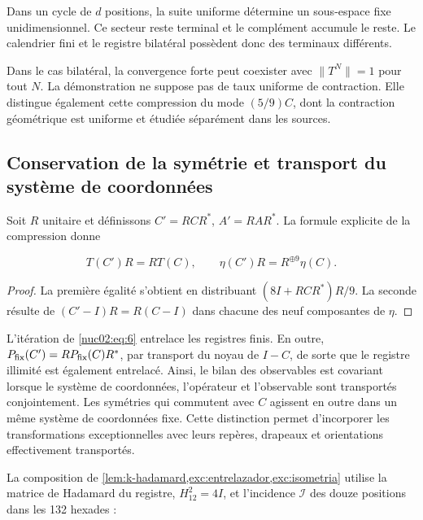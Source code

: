 \begin{corollary}
Dans un cycle de \(d\) positions, la suite uniforme détermine un sous-espace fixe unidimensionnel. Ce secteur reste terminal et le complément accumule le reste. Le calendrier fini et le registre bilatéral possèdent donc des terminaux différents.

\end{corollary}

Dans le cas bilatéral, la convergence forte peut coexister avec \(\|T^N\|=1\) pour tout \(N\). La démonstration ne suppose pas de taux uniforme de contraction. Elle distingue également cette compression du mode \((5/9)C\), dont la contraction géométrique est uniforme et étudiée séparément dans les sources.

\subsection{Conservation de la symétrie et transport du système de coordonnées}

Soit \(R\) unitaire et définissons \(C'=RCR^*\), \(A'=RAR^*\). La formule explicite de la compression donne

\begin{equation}
T(C')R=RT(C),\qquad
\eta(C')R=R^{\oplus9}\eta(C).\label{nuc02:eq:6}
\end{equation}

\begin{proof}
La première égalité s’obtient en distribuant \((8I+RCR^*)R/9\). La seconde résulte de \((C'-I)R=R(C-I)\) dans chacune des neuf composantes de \(\eta\).

\end{proof}

L’itération de \eqref{nuc02:eq:6} entrelace les registres finis. En outre, \(P_{\rm fix}(C')=RP_{\rm fix}(C)R^*\), par transport du noyau de \(I-C\), de sorte que le registre illimité est également entrelacé. Ainsi, le bilan des observables est covariant lorsque le système de coordonnées, l’opérateur et l’observable sont transportés conjointement. Les symétries qui commutent avec \(C\) agissent en outre dans un même système de coordonnées fixe. Cette distinction permet d’incorporer les transformations exceptionnelles avec leurs repères, drapeaux et orientations effectivement transportés.

La composition de \cref{lem:k-hadamard,exc:entrelazador,exc:isometria} utilise la matrice de Hadamard du registre, \(H_{12}^2=4I\), et l’incidence \(\mathcal I\) des douze positions dans les 132 hexades :


